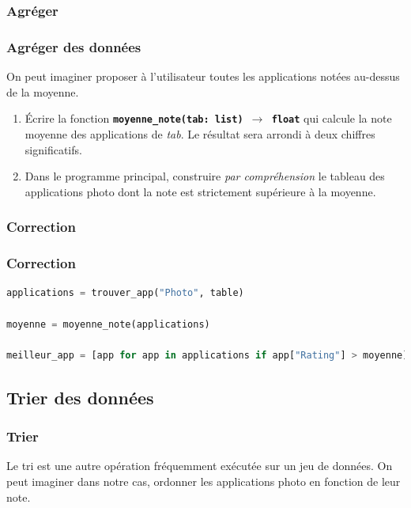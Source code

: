 \documentclass[svgnames,11pt]{beamer}
\begin{document}
\subsubsection{Agréger}
\begin{frame}
    \frametitle{Agréger des données}

    On peut imaginer proposer à l'utilisateur toutes les applications notées au-dessus de la moyenne.
    \begin{activite}
        \begin{enumerate}
            \item Écrire la fonction \textbf{\texttt{moyenne\_note(tab: list)  $\rightarrow$ float}} qui calcule la note moyenne des applications de \emph{tab}. Le résultat sera arrondi à deux chiffres significatifs.
            \item Dans le programme principal, construire \emph{par compréhension }le tableau des applications photo dont la note est strictement supérieure à la moyenne.
        \end{enumerate}
    \end{activite}
\end{frame}
\begin{frame}
    \frametitle{Correction}

    

\end{frame}
\begin{frame}[fragile]
    \frametitle{Correction}

    \begin{center}
        \begin{lstlisting}[language=Python, basicstyle=\small]
applications = trouver_app("Photo", table)

moyenne = moyenne_note(applications)

meilleur_app = [app for app in applications if app["Rating"] > moyenne]
\end{lstlisting}
        \label{CODE}
    \end{center}

\end{frame}
\subsection{Trier des données}
\begin{frame}
    \frametitle{Trier}

    Le tri est une autre opération fréquemment exécutée sur un jeu de données. On peut imaginer dans notre cas, ordonner les applications photo en fonction de leur note.

\end{frame}
\end{document}
